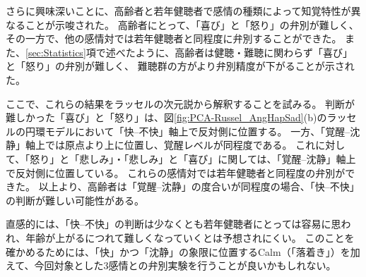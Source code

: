 さらに興味深いことに、高齢者と若年健聴者で感情の種類によって知覚特性が異なることが示唆された。
高齢者にとって、「喜び」と「怒り」の弁別が難しく、その一方で、他の感情対では若年健聴者と同程度に弁別することができた。
また、\ref{sec:Statistics}項で述べたように、高齢者は健聴・難聴に関わらず「喜び」と「怒り」の弁別が難しく、
難聴群の方がより弁別精度が下がることが示された。

ここで、これらの結果をラッセルの次元説\cite{russell1980circumplex}から解釈することを試みる。
判断が難しかった「喜び」と「怒り」は、図\ref{fig:PCA-Russel_AngHapSad}(b)のラッセルの円環モデルにおいて「快--不快」軸上で反対側に位置する。
一方、「覚醒--沈静」軸上では原点より上に位置し、覚醒レベルが同程度である。
これに対して、「怒り」と「悲しみ」・「悲しみ」と「喜び」に関しては、「覚醒--沈静」軸上で反対側に位置している。
これらの感情対では若年健聴者と同程度の弁別ができた。
以上より、高齢者は「覚醒--沈静」の度合いが同程度の場合、「快--不快」の判断が難しい可能性がある。

直感的には、「快--不快」の判断は少なくとも若年健聴者にとっては容易に思われ、年齢が上がるにつれて難しくなっていくとは予想されにくい。
このことを確かめるためには、「快」かつ「沈静」の象限に位置するCalm（「落着き」）を加えて、今回対象とした3感情との弁別実験を行うことが良いかもしれない。






